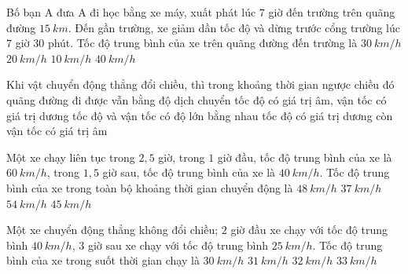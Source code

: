 \begin{ex}%
Bố bạn A đưa A đi học bằng xe máy, xuất phát lúc $7$ giờ đến trường trên quãng đường $15\ km$. Đến gần trường, xe giảm dần tốc độ và dừng trước cổng trường lúc $7$ giờ $30$ phút. Tốc độ trung bình của xe trên quãng đường đến trường là
\choice
{\True $30\ km/h$}
{$20\ km/h$}
{$10\ km/h$}
{$40\ km/h$}
\loigiai{
}
\end{ex}
\begin{ex}%
Khi vật chuyển động thẳng đổi chiều, thì trong khoảng thời gian ngược chiều đó 
\choice
{quãng đường đi được vẫn bằng độ dịch chuyển}
{tốc độ có giá trị âm, vận tốc có giá trị dương}
{\True tốc độ và vận tốc có độ lớn bằng nhau}
{tốc độ có giá trị dương còn vận tốc có giá trị âm}
\loigiai{
}
 \end{ex}

\begin{ex}%
Một xe chạy liên tục trong $2,5$ giờ, trong $1$ giờ đầu, tốc độ trung bình của xe là $60\ km/h$, trong $1,5$ giờ sau, tốc độ trung bình của xe là $40\ km/h$. Tốc độ trung bình của xe trong toàn bộ khoảng thời gian chuyển động là
\choice
{\True $48\ km/h$}
{$37\ km/h$}
{$54\ km/h$}
{$45\ km/h$}
\loigiai{
}
\end{ex}
\begin{ex}%
Một xe chuyển động thẳng không đổi chiều; $2$ giờ đầu xe chạy với tốc độ trung bình $40\ km/h$, $3$ giờ sau xe chạy với tốc độ trung bình $25\ km/h$. Tốc độ trung bình của xe trong suốt thời gian chạy là
\choice
{$30\ km/h$}
{\True $31\ km/h$}
{$32\ km/h$}
{$33\ km/h$}
\loigiai{}
\end{ex}

